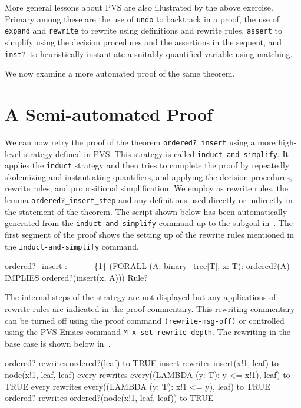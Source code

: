 \documentclass[11pt,twoside]{book}
\newcommand{\pvsref}[1]{\fbox{\footnotesize\ref{#1}}} \def\id#1{\hbox{\textt{#1}}} %
\begin{document}
 More general lessons about PVS are also illustrated by
the above exercise.  Primary among these are the use of \texttt{undo} to
backtrack in a proof, the use of \texttt{expand} and \texttt{rewrite} to
rewrite using definitions and rewrite rules, \texttt{assert} to simplify
using the decision procedures and the assertions in the sequent, 
and \texttt{inst?}\ to heuristically
instantiate a suitably quantified variable using matching.   

We now examine a more automated proof of the same theorem.

\section{A Semi-automated Proof}

We can now retry the proof of the theorem \texttt{ordered?\_insert}
using a more high-level strategy defined in PVS\@.  This strategy is
called \texttt{induct-and-simplify}.  It applies the \texttt{induct} strategy
and then tries to complete the proof by repeatedly skolemizing and
instantiating quantifiers, and applying the decision procedures,
rewrite rules, and propositional simplification.  We employ 
as rewrite rules, the lemma \texttt{ordered?\_insert\_step} and any 
definitions used directly or indirectly in the statement of the theorem\@.
The script shown below has been automatically generated from the \texttt{induct-and-simplify} command up to the subgoal in~\pvsref{subgoal1}\@.  
The first segment of the proof shows the setting up of the rewrite
rules mentioned in the \texttt{induct-and-simplify} command.
\begin{session*}
 ordered?_insert :  
  |-------
\{1\}   (FORALL (A: binary_tree[T], x: T):
         ordered?(A) IMPLIES ordered?(insert(x, A)))
Rule? 

\end{session*}
The internal steps of the strategy are not displayed but any applications
of rewrite rules are indicated in the proof commentary.  This rewriting
commentary 
can be turned off using the proof command \texttt{(rewrite-msg-off)} or
controlled using the PVS Emacs command \texttt{M-x set-rewrite-depth}\@.
The rewriting in the base case is shown below in~\pvsref{basecase}.
\begin{session*}\label{basecase}
ordered? rewrites ordered?(leaf)
  to TRUE
insert rewrites insert(x!1, leaf)
  to node(x!1, leaf, leaf)
every rewrites every((LAMBDA (y: T): y <= x!1), leaf)
  to TRUE
every rewrites every((LAMBDA (y: T): x!1 <= y), leaf)
  to TRUE
ordered? rewrites ordered?(node(x!1, leaf, leaf))
  to TRUE
\end{session*}
\end{document}
